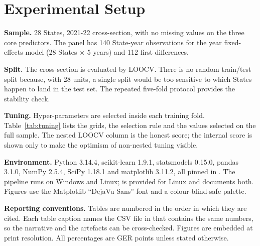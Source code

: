\section{Experimental Setup}\label{sec:setup}

\textbf{Sample.} 28 States, 2021-22 cross-section, with no missing values on the three core predictors. The panel has 140 State-year observations for the year fixed-effects model (28 States $\times$ 5 years) and 112 first differences.

\textbf{Split.} The cross-section is evaluated by LOOCV. There is no random train/test split because, with 28 units, a single split would be too sensitive to which States happen to land in the test set. The repeated five-fold protocol provides the stability check.

\textbf{Tuning.} Hyper-parameters are selected inside each training fold. Table~\ref{tab:tuning} lists the grids, the selection rule and the values selected on the full sample. The nested LOOCV column is the honest score; the internal score is shown only to make the optimism of non-nested tuning visible.

\textbf{Environment.} Python 3.14.4, scikit-learn 1.9.1, statsmodels 0.15.0, pandas 3.1.0, NumPy 2.5.4, SciPy 1.18.1 and matplotlib 3.11.2, all pinned in . The pipeline runs on Windows and Linux;  is provided for Linux and  documents both. Figures use the Matplotlib ``DejaVu Sans'' font and a colour-blind-safe palette.

\textbf{Reporting conventions.} Tables are numbered in the order in which they are cited. Each table caption names the CSV file in  that contains the same numbers, so the narrative and the artefacts can be cross-checked. Figures are embedded at print resolution. All percentages are GER points unless stated otherwise.
